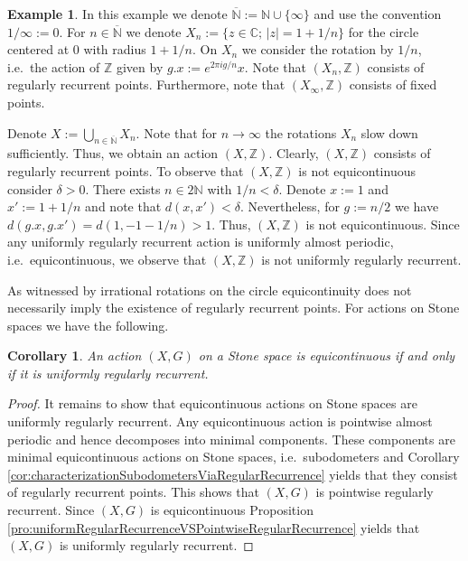 \documentclass[12pt, reqno]{amsart}
\newtheorem{corollary}[theorem]{Corollary}
\theoremstyle{definition}
\newtheorem{example}[theorem]{Example}
\theoremstyle{remark}
\numberwithin{equation}{section}
\theoremstyle{theorem}
\theoremstyle{remark}
\begin{document}
\begin{example}
    In this example we denote $\overline{\mathbb{N}}:=\mathbb{N}\cup \{\infty\}$ and use the convention $1/\infty:=0$. 
    For $n\in \overline{\mathbb{N}}$ we denote 
    $X_{n}:=\{z\in \mathbb{C};\, |z|=1+1/n\}$ for the circle centered at $0$ with radius $1+1/n$.
    On $X_n$ we consider the rotation by $1/n$, i.e.\ the action of $\mathbb{Z}$ given by 
    $g.x:=e^{2 \pi i g/n}x$. Note that $(X_n,\mathbb{Z})$ consists of regularly recurrent points. 
    Furthermore, note that $(X_\infty,\mathbb{Z})$ consists of fixed points. 

    Denote $X:=\bigcup_{n\in \overline{\mathbb{N}}}X_n$. 
    Note that for $n\to \infty$ the rotations $X_n$ slow down sufficiently. 
    Thus, we obtain an action $(X,\mathbb{Z})$. 
    Clearly, $(X,\mathbb{Z})$ consists of regularly recurrent points. 
    To observe that $(X,\mathbb{Z})$ is not equicontinuous consider $\delta>0$. There exists $n\in 2\mathbb{N}$ with $1/n<\delta$.
    Denote $x:=1$ and $x':=1+1/n$ and note that $d(x,x')<\delta$. 
    Nevertheless, for $g:=n/2$ we have $d(g.x,g.x')=d(1,-1-1/n)>1$. 
    Thus, $(X,\mathbb{Z})$ is not equicontinuous. 
    Since any uniformly regularly recurrent action is uniformly almost periodic, i.e.\ equicontinuous, we observe that $(X,\mathbb{Z})$ is not uniformly regularly recurrent. 
\end{example}

As witnessed by irrational rotations on the circle equicontinuity does not necessarily imply the existence of regularly recurrent points. 
For actions on Stone spaces we have the following. 

\begin{corollary}
\label{cor:uniformRegularRecurrenceAndStoneSpaces}
    An action $(X,G)$ on a Stone space is equicontinuous if and only if it is uniformly regularly recurrent. 
\end{corollary}
\begin{proof}
    It remains to show that equicontinuous actions on Stone spaces are uniformly regularly recurrent. 
    Any equicontinuous action is pointwise almost periodic and hence decomposes into minimal components. These components are minimal equicontinuous actions on Stone spaces, i.e.\ subodometers and Corollary \ref{cor:characterizationSubodometersViaRegularRecurrence} yields that they consist of regularly recurrent points. This shows that $(X,G)$ is pointwise regularly recurrent. Since $(X,G)$ is equicontinuous Proposition \ref{pro:uniformRegularRecurrenceVSPointwiseRegularRecurrence} yields that $(X,G)$ is uniformly regularly recurrent.
\end{proof}
\end{document}
